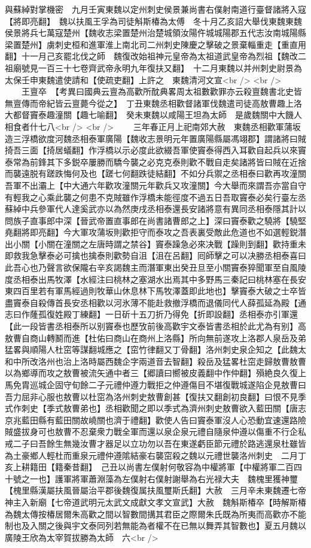 與蘇綽對掌機密　九月壬寅東魏以定州刺史侯景兼尚書右僕射南道行臺督諸將入寇【將即亮翻】　魏以扶風王孚為司徒斛斯椿為太傅　冬十月乙亥詔大舉伐東魏東魏侯景將兵七萬寇楚州【魏收志梁置楚州治楚城領汝陽仵城城陽郡五代志汝南城陽縣梁置楚州】虜刺史桓和進軍淮上南北司二州刺史陳慶之擊破之景棄輜重走【重直用翻】十一月己亥罷北伐之師　魏復改始祖神元皇帝為太祖道武皇帝為烈祖【魏改二祖廟號見一百三十七卷齊武帝永明九年復扶又翻】　十二月東魏以并州刺史尉景為太保壬申東魏遣使請和【使疏吏翻】上許之　東魏清河文宣<br />
<br />
　　王亶卒　【考異曰國典云亶為高歡所酖典畧周太祖數歡罪亦云殺亶魏書北史皆無亶傳而帝紀皆云亶薨今從之】　丁丑東魏丞相歡督諸軍伐魏遣司徒高敖曹趣上洛大都督竇泰趣潼關【趣七喻翻】　癸未東魏以咸陽王坦為太師　是歲魏關中大饑人相食者什七八<br />
<br />
　　三年春正月上祀南郊大赦　東魏丞相歡軍蒲坂造三浮橋欲度河魏丞相泰軍廣陽【魏收志景明元年置廣陽縣屬馮翊郡】謂諸將曰賊掎吾三面【掎居蟻翻】作浮橋以示必度此欲綴吾軍使竇泰得西入耳歡自起兵以來竇泰常為前鋒其下多鋭卒屢勝而驕今襲之必克克泰則歡不戰自走矣諸將皆曰賊在近捨而襲遠脱有蹉跌悔何及也【蹉七何翻跌徒結翻】不如分兵禦之丞相泰曰歡再攻潼關吾軍不出灞上【中大通六年歡攻潼關元年歡兵又攻潼關】今大舉而來謂吾亦當自守有輕我之心乘此襲之何患不克賊雖作浮橋未能徑度不過五日吾取竇泰必矣行臺左丞蘇綽中兵參軍代人達奚武亦以為然庚戌丞相泰還長安諸將意有異同丞相泰隱其計以問族子直事郎中深【晉武帝置直事郎在尚書諸曹郎之上】深曰竇泰歡之驍將【驍堅堯翻將即亮翻】今大軍攻蒲坂則歡拒守而泰攻之吾表裏受敵此危道也不如選輕鋭潛出小關【小關在潼關之左唐時謂之禁谷】竇泰躁急必來决戰【躁則到翻】歡持重未即救我急擊泰必可擒也擒泰則歡勢自沮【沮在呂翻】囘師擊之可以决勝丞相泰喜曰此吾心也乃聲言欲保隴右辛亥謁魏主而潛軍東出癸丑旦至小關竇泰猝聞軍至自風陵度丞相泰出馬牧澤【水經注曰桃林之塞湖水出焉其中多野馬三秦記曰桃林塞在長安東四百里若有軍馬經過則牧華山休息林下馬牧澤蓋即此地也】擊竇泰大破之士卒皆盡竇泰自殺傳首長安丞相歡以河氷薄不能赴救撤浮橋而退儀同代人薛孤延為殿【通志曰作蕯孤復姓殿丁練翻】一日斫十五刀折乃得免【折即設翻】丞相泰亦引軍還【此一段皆書丞相泰所以别竇泰也歷攷前後高歡宇文泰皆書丞相於此尤為有别】高敖曹自商山轉鬭而進【杜佑曰商山在商州上洛縣】所向無前遂攻上洛郡人泉岳及弟猛畧與順陽人杜窋等謀翻城應之【窋竹律翻又丁骨翻】洛州刺史泉企知之【此魏太和中所改洛州也治上洛時屬西魏企字兩道音去智翻】殺岳及猛畧杜窋走歸敖曹敖曹以為鄉導而攻之敖曹被流矢通中者三【郷讀曰嚮被皮義翻中作仲翻】殞絶良久復上馬免胄巡城企固守旬餘二子元禮仲遵力戰拒之仲遵傷目不堪復戰城遂陷企見敖曹曰吾力屈非心服也敖曹以杜窋為洛州刺史敖曹創甚【復扶又翻創初良翻】曰恨不見季式作刺史【季式敖曹弟也】丞相歡聞之即以季式為濟州刺史敖曹欲入藍田關【唐志京兆藍田縣有藍田關故嶢關也濟于禮翻】歡使人告曰竇泰軍沒人心恐動宜速還路險賊盛拔身可也敖曹不忍棄衆力戰全軍而還以泉企泉元禮自隨泉仲遵以傷重不行企私戒二子曰吾餘生無幾汝曹才器足以立功勿以吾在東遂虧臣節元禮於路逃還泉杜雖皆為土豪鄉人輕杜而重泉元禮仲遵隂結豪右襲窋殺之魏以元禮世襲洛州刺史　二月丁亥上耕籍田【籍秦昔翻】　己丑以尚書左僕射何敬容為中權將軍【中權將軍二百四十號之一也】護軍將軍蕭淵藻為左僕射右僕射謝舉為右光禄大夫　魏槐里獲神璽【槐里縣漢屬扶風晉屬治平郡後魏復属扶風璽斯氏翻】大赦　三月辛未東魏遷七帝神主入新廟【七帝道武明元太武文成獻文孝文宣武】大赦　魏斛斯椿卒【時解斯椿為魏太傳按椿居爾朱高歡之間以智數間搆其君臣之際爾朱氏既為所夷而高歡亦不能制也及入關之後與宇文泰同列若無能為者權不在已無以舞弄其智數也】夏五月魏以廣陵王欣為太宰賀拔勝為太師　六<br />
